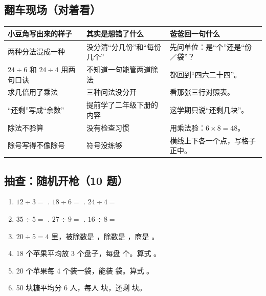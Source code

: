 \subsection{翻车现场（对着看）}

\begin{center}
\small
\begin{tabularx}{\linewidth}{@{}p{3.8cm}p{4.0cm}X@{}}
\toprule
\textbf{小豆角写出来的样子} & \textbf{其实是想错了什么} & \textbf{爸爸回一句什么} \\
\midrule
两种分法混成一种 & 没分清“分几份”和“每份几个” & 先问单位：是“个”还是“份／袋”？ \\
\addlinespace[2pt]
$24\div6$ 和 $24\div4$ 用两句口诀 & 不知道一句能管两道除法 & 都回到“四六二十四”。\\
\addlinespace[2pt]
求几倍用了乘法 & 三种问法没分开 & 看那张三行对照表。\\
\addlinespace[2pt]
“还剩”写成“余数” & 提前学了二年级下册的内容 & 这学期只说“还剩几块”。\\
\addlinespace[2pt]
除法不验算 & 没有检查习惯 & 用乘法验：$6\times8=48$。\\
\addlinespace[2pt]
除号写得不像除号 & 符号没练够 & 横线上下各一个点，写格子正中。\\
\bottomrule
\end{tabularx}
\end{center}

\subsection{抽查：随机开枪（10 题）}

\begin{enumerate}[label=\arabic*.,itemsep=4pt]
  \item $12\div3=$ \blank[1.4cm] . $18\div6=$ \blank[1.4cm] . $24\div4=$ \blank[1.4cm]
  \item $35\div5=$ \blank[1.4cm] . $27\div9=$ \blank[1.4cm] . $16\div8=$ \blank[1.4cm]
  \item $20\div5=4$ 里，被除数是 \blank[1.2cm]，除数是 \blank[1.2cm]，商是 \blank[1.2cm]。
  \item 18 个苹果平均放 3 个盘子，每盘 \blank[1.4cm] 个。算式 \blank[2.6cm]。
  \item 20 个苹果每 4 个装一袋，能装 \blank[1.4cm] 袋。算式 \blank[2.6cm]。
  \item 50 块糖平均分 6 人，每人 \blank[1.2cm] 块，还剩 \blank[1.2cm] 块。
\end{enumerate}

